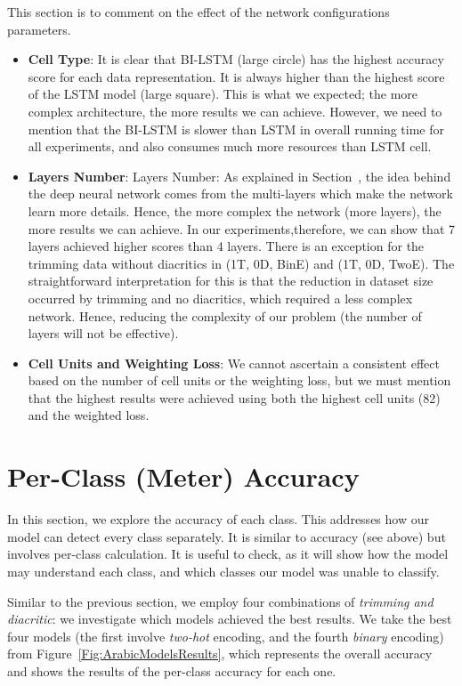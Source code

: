 This section is to comment on the effect of the network configurations parameters.
\begin{itemize}

\item \textbf{Cell Type}: It is clear that BI-LSTM (large circle) has the highest accuracy score for each data representation. It is always higher than the highest score of the LSTM model (large square). This is what we expected; the more complex architecture, the more results we can achieve. However, we need to mention that the BI-LSTM is slower than LSTM in overall running time for all experiments, and also consumes much more resources than LSTM cell.
\item \textbf{Layers Number}: Layers Number: As explained in Section~, the idea behind the deep neural network comes from the multi-layers which make the network learn more details. Hence, the more complex the network (more layers), the more results we can achieve. In our experiments,therefore, we can show that 7 layers achieved higher scores than 4 layers. There is an exception for the trimming data without diacritics in (1T, 0D, BinE) and (1T, 0D, TwoE). The straightforward interpretation for this is that the reduction in dataset size occurred by trimming and no diacritics, which required a less complex network. Hence, reducing the complexity of our problem (the number of layers will not be effective).
\item \textbf{Cell Units and Weighting Loss}: We cannot ascertain a consistent effect based on the number of cell units or the weighting loss, but we must mention that the highest results were achieved using both the highest cell units (82) and the weighted loss.

\end{itemize}



\section{Per-Class (Meter) Accuracy}

In this section, we explore the accuracy of each class. This addresses how our model can detect every class separately. It is similar to accuracy (see above) but involves per-class calculation. It is useful to check, as it will show how the model may understand each class, and which classes our model was unable to classify. 

Similar to the previous section, we employ four combinations of \textit{trimming and diacritic}: we investigate which models achieved the best results. We take the best four models (the first involve \textit{two-hot} encoding, and the fourth \textit{binary} encoding) from Figure~\ref{Fig:ArabicModelsResults}, which represents the overall accuracy and shows the results of the per-class accuracy for each one.

